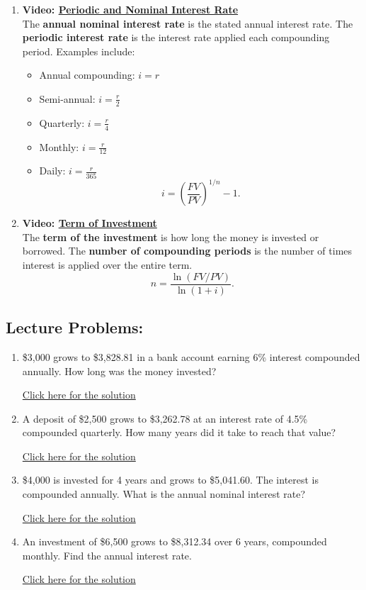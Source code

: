 \documentclass[
]{book}
\providecommand{\tightlist}{%
  \setlength{\itemsep}{0pt}\setlength{\parskip}{0pt}}
\begin{document}
\begin{enumerate}
\def\labelenumi{\arabic{enumi}.}
\tightlist
\item
  \textbf{Video: \href{https://youtu.be/n2Z1aLFtaiE}{Periodic and Nominal Interest Rate}}\\
  The \textbf{annual nominal interest rate} is the stated annual interest rate. The \textbf{periodic interest rate} is the interest rate applied each compounding period. Examples include:

  \begin{itemize}
  \tightlist
  \item
    Annual compounding: \(i = r\)
  \item
    Semi-annual: \(i = \frac{r}{2}\)
  \item
    Quarterly: \(i = \frac{r}{4}\)
  \item
    Monthly: \(i = \frac{r}{12}\)
  \item
    Daily: \(i = \frac{r}{365}\)
    \[
     i = \left(\dfrac{FV}{PV} \right)^{1/n} - 1.
     \]
  \end{itemize}
\item
  \textbf{Video: \href{https://youtu.be/rfa1WBzjMaY}{Term of Investment}}\\
  The \textbf{term of the investment} is how long the money is invested or borrowed. The \textbf{number of compounding periods} is the number of times interest is applied over the entire term.\\
  \[
   n = \dfrac{\ln(FV/PV)}{\ln(1+i)}.
   \]
\end{enumerate}

\subsection*{Lecture Problems:}\label{lecture-problems-10}

\begin{enumerate}
\def\labelenumi{\arabic{enumi}.}
\tightlist
\item
  \$3,000 grows to \$3,828.81 in a bank account earning 6\% interest compounded annually. How long was the money invested?

  \href{https://youtu.be/ala74SWNy-Y}{Click here for the solution}
\item
  A deposit of \$2,500 grows to \$3,262.78 at an interest rate of 4.5\% compounded quarterly. How many years did it take to reach that value?

  \href{https://youtu.be/FTwVwzi5Nf0}{Click here for the solution}
\item
  \$4,000 is invested for 4 years and grows to \$5,041.60. The interest is compounded annually. What is the annual nominal interest rate?

  \href{https://youtu.be/3plLnxnEtHU}{Click here for the solution}
\item
  An investment of \$6,500 grows to \$8,312.34 over 6 years, compounded monthly. Find the annual interest rate.

  \href{https://youtu.be/fnOVWqeE4gI}{Click here for the solution}
\end{enumerate}
\end{document}
